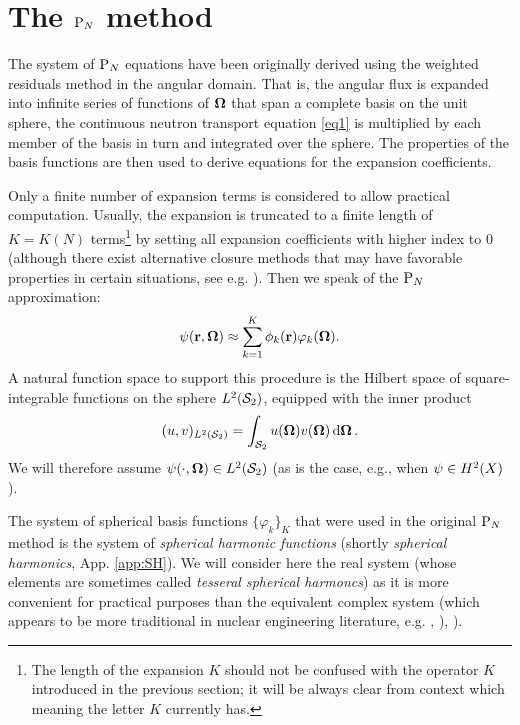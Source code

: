 \section{The $\PN$ method}\label{sec:PN}

The system of $\PN$ equations have been originally derived using the weighted
residuals method in the angular domain. That is, the angular flux is expanded into infinite series of functions of
$\bomega$ that span a complete basis on the unit sphere, the continuous neutron transport equation \eqref{eq1} is multiplied by each member of
the basis in turn and integrated over the sphere. The properties of the basis functions are then used to derive
equations for the expansion coefficients. 

Only a finite number of expansion terms is considered to allow practical computation.
Usually, the expansion is truncated to a finite length of $K = K(N)$ terms\footnote{The length of the expansion $K$
should not be confused with the operator $K$ introduced in the previous section; it will be always clear from context 
which meaning the letter $K$ currently has.} by setting all expansion coefficients with higher index to 0 (although there exist alternative closure methods that may have favorable properties in certain situations, see e.g.
\cite{Frank0}). Then we speak of the $\PN$ approximation:
\begin{equation}\label{eq1.1}
  \psi(\br,\bomega) \approx \sum_{k=1}^{ K} \phi_k(\br) \varphi_k(\bomega).
\end{equation}
A natural function space to support this procedure is the Hilbert space of
square-integrable functions on the sphere $\Lp[2](\Sphere)$, equipped with the inner product
\begin{equation}\label{eq:s2_ip}
	(u, v)_{\Lp[2](\Sphere)} = \intA{u(\bomega) {v(\bomega)}}.
\end{equation}
We will therefore assume \mbox{$\psi(\cdot,\bomega)\in\Lp[2](\Sphere)$} (as is the case, e.g., when 
$\psi\in\Hp[2](X)$).

The system of spherical basis functions $\{\varphi_k\}_K$ that were used in the original $\PN$ method is the
system of \textit{spherical harmonic functions} (shortly \textit{spherical harmonics}, App. \ref{app:SH}).
We will consider here the real system (whose elements are sometimes called \textit{tesseral spherical harmoncs}) as it is more convenient
for practical purposes than the equivalent complex system (which appears to be more traditional in nuclear engineering 
literature, e.g. \cite[Sec. 9.7]{Stacey1}, \cite[Sec. 14.4]{Reuss1}), \cite[Chap. V]{Stammler}). 

